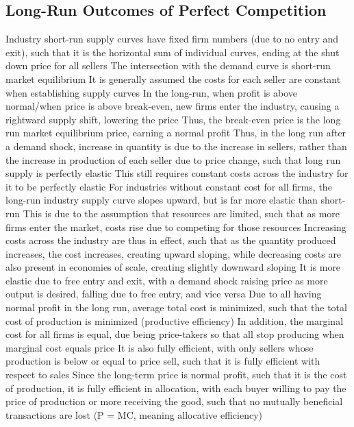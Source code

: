 \documentclass[11 pt, twoside]{article}
\newenvironment{outline*}
{
	\begin{outline}[enumerate]
	}
	{\end{outline}
}
\begin{document}
\subsection{Long-Run Outcomes of Perfect Competition}
\begin{outline*}
\1 Industry short-run supply curves have fixed firm numbers (due to no entry and exit), such that it is the horizontal sum of individual curves, ending at the shut down price for all sellers
\2 The intersection with the demand curve is short-run market equilibrium
\2 It is generally assumed the costs for each seller are constant when establishing supply curves
\1 In the long-run, when profit is above normal/when price is above break-even, new firms enter the industry, causing a rightward supply shift, lowering the price
\2 Thus, the break-even price is the long run market equilibrium price, earning a normal profit
\2 Thus, in the long run after a demand shock, increase in quantity is due to the increase in sellers, rather than the increase in production of each seller due to price change, such that long run supply is perfectly elastic
\2 This still requires constant costs across the industry for it to be perfectly elastic
\1 For industries without constant cost for all firms, the long-run industry supply curve slopes upward, but is far more elastic than short-run
\2 This is due to the assumption that resources are limited, such that as more firms enter the market, costs rise due to competing for those resources
\2 Increasing costs across the industry are thus in effect, such that as the quantity produced increases, the cost increases, creating upward sloping, while decreasing costs are also present in economies of scale, creating slightly downward sloping
\2 It is more elastic due to free entry and exit, with a demand shock raising price as more output is desired, falling due to free entry, and vice versa
\1 Due to all having normal profit in the long run, average total cost is minimized, such that the total cost of production is minimized (productive efficiency)
\2 In addition, the marginal cost for all firms is equal, due being price-takers so that all stop producing when marginal cost equals price
\2 It is also fully efficient, with only sellers whose production is below or equal to price sell, such that it is fully efficient with respect to sales
\3 Since the long-term price is normal profit, such that it is the cost of production, it is fully efficient in allocation, with each buyer willing to pay the price of production or more receiving the good, such that no mutually beneficial transactions are lost (P = MC, meaning allocative efficiency)
\end{outline*}
\end{document}

